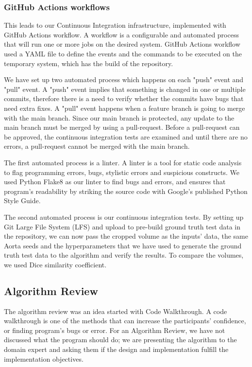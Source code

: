 \subsubsection{GitHub Actions workflows}
This leads to our Continuous Integration infrastructure, implemented with GitHub Actions workflow. A workflow is a configurable and automated process that will run one or more jobs on the desired system. GitHub Actions workflow used a YAML file to define the events and the commands to be executed on the temporary system, which has the build of the repository. \cite{GitHubActions}

We have set up two automated process which happens on each "push" event and "pull" event. A "push" event implies that something is changed in one or multiple commits, therefore there is a need to verify whether the commits have bugs that need extra fixes. A "pull" event happens when a feature branch is going to merge with the main branch. Since our main branch is protected, any update to the main branch must be merged by using a pull-request. Before a pull-request can be approved, the continuous integration tests are examined and until there are no errors, a pull-request cannot be merged with the main branch. 

The first automated process is a linter. A linter is a tool for static code analysis to flag programming errors, bugs, stylistic errors and suspicious constructs. We used Python Flake8 as our linter to find bugs and errors, and ensures that program's readability by striking the source code with Google's published  Python Style Guide. \cite{Linter}

The second automated process is our continuous integration tests. By setting up Git Large File System (LFS) and upload to pre-build ground truth test data in the repository, we can now pass the cropped volume as the inputs' data, the same Aorta seeds and the hyperparameters that we have used to generate the ground truth test data to the algorithm and verify the results. To compare the volumes, we used Dice similarity coefficient.

\subsection{Algorithm Review}

The algorithm review was an idea started with Code Walkthrough. A code walkthrough is one of the methods that can increase the participants' confidence, or finding program's bugs or error. For an Algorithm Review, we have not discussed what the program should do; we are presenting the algorithm to the domain expert and asking them if the design and implementation fulfill the implementation objectives.


